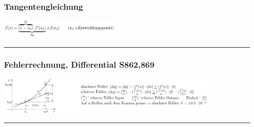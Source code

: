 \subsubsection{Tangentengleichung}
\includegraphics[width=6cm]{images/Tang.PNG}\\
\hrule
\subsubsection{Fehlerrechnung, Differential \color{red}S862,869}
\includegraphics[width=11cm]{images/Fehlerr.PNG}\\
\hrule
